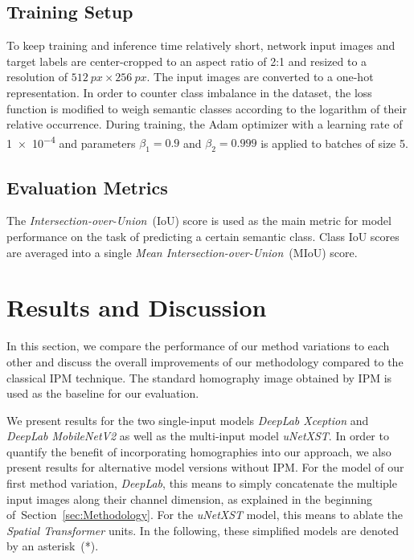 \documentclass[a4paper, 10pt, conference]{ieeeconf}
\newcommand{\sect}[1]{Section~\ref{#1}}
\begin{document}
\subsection{Training Setup}

To keep training and inference time relatively short, network input images and target labels are center-cropped to an aspect ratio of 2:1 and resized to a resolution of \( \SI{512}{px} \times \SI{256}{px} \). The input images are converted to a one-hot representation. In order to counter class imbalance in the dataset, the loss function is modified to weigh semantic classes according to the logarithm of their relative occurrence. During training, the Adam optimizer with a learning rate of 
\num{1e-4} and parameters \( \beta_1 = 0.9 \) and \( \beta_2 = 0.999 \) is applied to batches of size \num{5}.

\subsection{Evaluation Metrics}

The \textit{Intersection-over-Union}~(IoU) score is used as the main metric for model performance on the task of predicting a certain semantic class. Class IoU scores are averaged into a single \textit{Mean Intersection-over-Union}~(MIoU) score.


\section{Results and Discussion}\label{sect:ResultsAndDiscussion}

In this section, we compare the performance of our method variations to each other and discuss the overall improvements of our methodology compared to the classical IPM technique. The standard homography image obtained by IPM is used as the baseline for our evaluation.

We present results for the two single-input models \textit{DeepLab Xception} and \textit{DeepLab MobileNetV2} as well as the multi-input model \textit{uNetXST}. In order to quantify the benefit of incorporating homographies into our approach, we also present results for alternative model versions without IPM. For the model of our first method variation, \textit{DeepLab}, this means to simply concatenate the multiple input images along their channel dimension, as explained in the beginning of~\sect{sec:Methodology}. For the \textit{uNetXST} model, this means to ablate the \textit{Spatial Transformer} units. In the following, these simplified models are denoted by an asterisk~(*).
\end{document}
